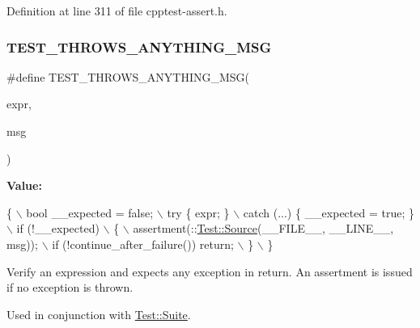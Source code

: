 Definition at line 311 of file cpptest-\/assert.\+h.

\mbox{\label{cpptest-assert_8h_a052597a8fd7dbc40ba350c735c4517c5}} 
\subsubsection{\texorpdfstring{T\+E\+S\+T\+\_\+\+T\+H\+R\+O\+W\+S\+\_\+\+A\+N\+Y\+T\+H\+I\+N\+G\+\_\+\+M\+SG}{TEST\_THROWS\_ANYTHING\_MSG}}
{\footnotesize\ttfamily \#define T\+E\+S\+T\+\_\+\+T\+H\+R\+O\+W\+S\+\_\+\+A\+N\+Y\+T\+H\+I\+N\+G\+\_\+\+M\+SG(\begin{DoxyParamCaption}\item[{}]{expr,  }\item[{}]{msg }\end{DoxyParamCaption})}

{\bfseries Value\+:}
\begin{DoxyCode}
\{                                                               \(\backslash\)
        bool \_\_expected = \textcolor{keyword}{false};                                    \(\backslash\)
        try \{ expr; \}                                               \(\backslash\)
        catch (...) \{ \_\_expected = \textcolor{keyword}{true}; \}                          \(\backslash\)
        if (!\_\_expected)                                            \(\backslash\)
        \{                                                           \(\backslash\)
            assertment(::\mbox{\hyperlink{class_test_1_1_source}{Test::Source}}(\_\_FILE\_\_, \_\_LINE\_\_, msg));    \(\backslash\)
            if (!continue\_after\_failure()) return;                  \(\backslash\)
        \}                                                           \(\backslash\)
    \}
\end{DoxyCode}
Verify an expression and expects any exception in return. An assertment is issued if no exception is thrown.

Used in conjunction with \mbox{\hyperlink{class_test_1_1_suite}{Test\+::\+Suite}}.



